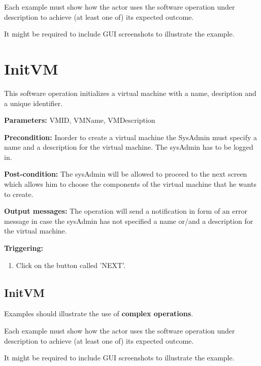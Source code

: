 Each example must show how the actor uses the software operation under
description to achieve (at least one of) its expected outcome.

It might be required to include GUI screenshots to illustrate the example.









\section{InitVM}
\label{operation:InitVM}
This software operation initializes a virtual machine with a name, desription
and a unique identifier.
\begin{description}

\item \textbf{Parameters:} VMID, VMName, VMDescription
\item \textbf{Precondition:} Inorder to create a virtual machine the SysAdmin must
specify a name and a description for the virtual machine. The sysAdmin has to be
logged in.
\item \textbf{Post-condition:} The sysAdmin will be allowed to proceed to the
next screen which allows him to choose the components of the virtual machine
that he wants to create.
\item \textbf{Output messages:} The operation will send a notification in form
of an error message in case the sysAdmin has not specified a name or/and a
description for the virtual machine.

\item \textbf{Triggering:}
\begin{enumerate}
\item Click on the button called 'NEXT'.
\end{enumerate}

 
\end{description}

\subsection{InitVM}
Examples should illustrate the use of \textbf{complex operations}.

Each example must show how the actor uses the software operation under
description to achieve (at least one of) its expected outcome.

It might be required to include GUI screenshots to illustrate the example.








